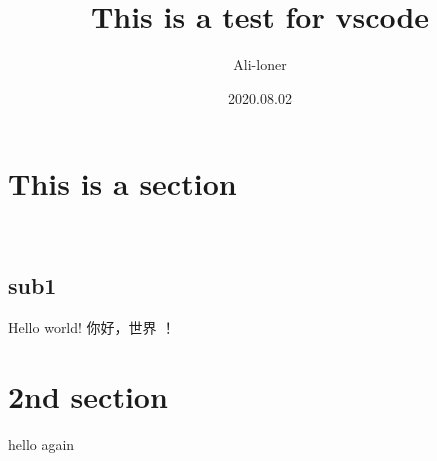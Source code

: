 \documentclass[a4paper]{article}
\title{\heiti\zihao{2} This is a test for vscode}
\author{\songti Ali-loner}
\date{2020.08.02}
\begin{document}
    \maketitle
\begin{abstract}
    \lipsum[2]
\end{abstract}
\tableofcontents
\section{This is a section}\
\subsection{sub1}
Hello world! 你好，世界 ！

\newpage
\section{2nd section}
hello again
\end{document}
